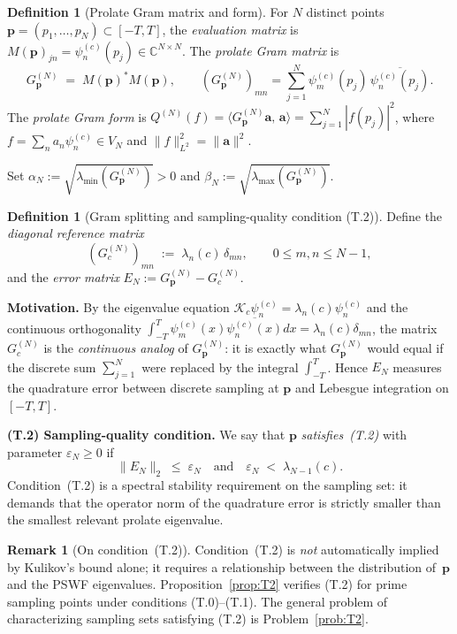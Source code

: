 \documentclass[12pt,a4paper]{amsart}
\theoremstyle{definition}
\newtheorem{definition}[theorem]{Definition}
\newtheorem{remark}[theorem]{Remark}
\newcommand{\Kop}{\mathcal{K}_c}
\newcommand{\GVM}{G^{(N)}_{\mathbf{p}}}
\newcommand{\AM}{\alpha_N}
\newcommand{\BM}{\beta_N}
\newcommand{\QM}{Q^{(N)}}
\newcommand{\psin}{\psi_n^{(c)}}
\newcommand{\EN}{E_N}
\newcommand{\norm}[1]{\|#1\|}
\newcommand{\ip}[2]{\langle #1,\, #2\rangle}
\begin{document}
\begin{definition}[Prolate Gram matrix and form]\label{def:GramForm}
For $N$ distinct points $\mathbf{p}=(p_1,\ldots,p_N)\subset[-T,T]$,
the \emph{evaluation matrix} is
$M(\mathbf{p})_{jn}=\psi_n^{(c)}(p_j)\in\mathbb{C}^{N\times N}$.
The \emph{prolate Gram matrix} is
\[
  \GVM\;=\;M(\mathbf{p})^*M(\mathbf{p}),
  \qquad
  (\GVM)_{mn}=\sum_{j=1}^N\psi_m^{(c)}(p_j)\,\overline{\psi_n^{(c)}(p_j)}.
\]
The \emph{prolate Gram form} is
$\QM(f)=\ip{\GVM\mathbf{a}}{\mathbf{a}}=\sum_{j=1}^N|f(p_j)|^2$,
where $f=\sum_na_n\psin\in V_N$ and $\norm{f}_{L^2}^2=\norm{\mathbf{a}}^2$.
\end{definition}

\noindent Set $\AM:=\sqrt{\lambda_{\min}(\GVM)}>0$ and
$\BM:=\sqrt{\lambda_{\max}(\GVM)}$.

\begin{definition}[Gram splitting and sampling-quality condition
                   (T.2)]\label{def:T2}
Define the \emph{diagonal reference matrix}
\[
  (G_c^{(N)})_{mn}\;:=\;\lambda_n(c)\,\delta_{mn},
  \qquad 0\leq m,n\leq N-1,
\]
and the \emph{error matrix} $\EN:=\GVM-G_c^{(N)}$.

\medskip
\noindent\textbf{Motivation.}
By the eigenvalue equation $\Kop\psin=\lambda_n(c)\psin$ and the
continuous orthogonality
$\int_{-T}^T\psi_m^{(c)}(x)\overline{\psi_n^{(c)}(x)}dx
=\lambda_n(c)\delta_{mn}$,
the matrix $G_c^{(N)}$ is the \emph{continuous analog} of $\GVM$:
it is exactly what $\GVM$ would equal if the discrete sum
$\sum_{j=1}^N$ were replaced by the integral $\int_{-T}^T$.
Hence $\EN$ measures the quadrature error between discrete
sampling at $\mathbf{p}$ and Lebesgue integration on $[-T,T]$.

\medskip
\noindent\textbf{(T.2) Sampling-quality condition.}
We say that $\mathbf{p}$ \emph{satisfies~(T.2)} with parameter
$\varepsilon_N\geq0$ if
\[
  \norm{\EN}_2\;\leq\;\varepsilon_N
  \quad\text{and}\quad
  \varepsilon_N\;<\;\lambda_{N-1}(c).
\]
Condition~(T.2) is a spectral stability requirement on the
sampling set: it demands that the operator norm of the
quadrature error is strictly smaller than the smallest
relevant prolate eigenvalue.
\end{definition}

\begin{remark}[On condition~(T.2)]\label{rem:T2}
Condition~(T.2) is \emph{not} automatically implied by Kulikov's
bound alone; it requires a relationship between the distribution
of~$\mathbf{p}$ and the PSWF eigenvalues. Proposition~\ref{prop:T2}
verifies (T.2) for prime sampling points under conditions (T.0)--(T.1).
The general problem of characterizing
sampling sets satisfying (T.2) is Problem~\ref{prob:T2}.
\end{remark}
\end{document}
